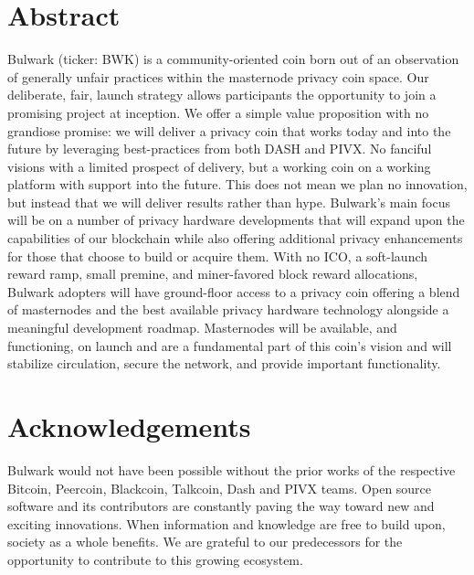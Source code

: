 \documentclass[11pt,a4paperpaper,]{report}
\begin{document}
\chapter*{Abstract}\label{abstract}

Bulwark (ticker: BWK) is a community-oriented coin born out of an
observation of generally unfair practices within the masternode privacy
coin space. Our deliberate, fair, launch strategy allows participants
the opportunity to join a promising project at inception. We offer a
simple value proposition with no grandiose promise: we will deliver a
privacy coin that works today and into the future by leveraging
best-practices from both DASH and PIVX. No fanciful visions with a
limited prospect of delivery, but a working coin on a working platform
with support into the future. This does not mean we plan no innovation,
but instead that we will deliver results rather than hype. Bulwark's
main focus will be on a number of privacy hardware developments that
will expand upon the capabilities of our blockchain while also offering
additional privacy enhancements for those that choose to build or
acquire them. With no ICO, a soft-launch reward ramp, small premine, and
miner-favored block reward allocations, Bulwark adopters will have
ground-floor access to a privacy coin offering a blend of masternodes
and the best available privacy hardware technology alongside a
meaningful development roadmap. Masternodes will be available, and
functioning, on launch and are a fundamental part of this coin's vision
and will stabilize circulation, secure the network, and provide
important functionality.  \setcounter{page}{1}

\chapter*{Acknowledgements}\label{acknowledgements}

Bulwark would not have been possible without the prior works of the
respective Bitcoin, Peercoin, Blackcoin, Talkcoin, Dash and PIVX teams.
Open source software and its contributors are constantly paving the way
toward new and exciting innovations. When information and knowledge are
free to build upon, society as a whole benefits. We are grateful to our
predecessors for the opportunity to contribute to this growing
ecosystem.

\newpage

\end{document}
